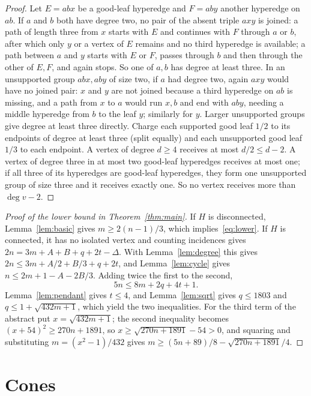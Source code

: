 \documentclass[11pt]{article}
\theoremstyle{remark}
\begin{document}
\begin{proof}
Let $E=abx$ be a good-leaf hyperedge and $F=aby$ another hyperedge on $ab$.
If $a$ and $b$ both have degree two, no pair of the absent triple $axy$ is
joined: a path of length three from $x$ starts with $E$ and continues with
$F$ through $a$ or $b$, after which only $y$ or a vertex of $E$ remains and
no third hyperedge is available; a path between $a$ and $y$ starts with
$E$ or $F$, passes through $b$ and then through the other of $E,F$, and
again stops. So one of $a,b$ has degree at least three. In an unsupported
group $abx,aby$ of size two, if $a$ had degree two, again $axy$ would have
no joined pair: $x$ and $y$ are not joined because a third hyperedge on $ab$
is missing, and a path from $x$ to $a$ would run $x,b$ and end with $aby$,
needing a middle hyperedge from $b$ to the leaf $y$; similarly for $y$.
Larger unsupported groups give degree at least three directly. Charge each supported good leaf $1/2$ to
its endpoints of degree at least three (split equally) and each
unsupported good leaf $1/3$ to each endpoint. A vertex of degree $d\ge4$
receives at most $d/2\le d-2$. A vertex of degree three in at most two
good-leaf hyperedges receives at most one; if all three of its hyperedges
are good-leaf hyperedges, they form one unsupported group of size three
and it receives exactly one. So no vertex receives more than $\deg v-2$.
\end{proof}

\begin{proof}[Proof of the lower bound in Theorem~\ref{thm:main}]
If $H$ is disconnected, Lemma~\ref{lem:basic} gives $m\ge2(n-1)/3$, which
implies~\eqref{eq:lower}. If $H$ is connected, it has no isolated vertex
and counting incidences gives $2n=3m+A+B+q+2t-\Delta$. With
Lemma~\ref{lem:degree} this gives $2n\le3m+A/2+B/3+q+2t$, and
Lemma~\ref{lem:cycle} gives $n\le2m+1-A-2B/3$. Adding twice the first to
the second,
\[
5n\le8m+2q+4t+1 .
\]
Lemma~\ref{lem:pendant} gives $t\le4$, and Lemma~\ref{lem:sqrt} gives
$q\le1803$ and $q\le1+\sqrt{432m+1}$, which yield the two inequalities.
For the third term of the abstract put $x=\sqrt{432m+1}$; the second
inequality becomes $(x+54)^2\ge270n+1891$, so
$x\ge\sqrt{270n+1891}-54>0$, and squaring and substituting
$m=(x^2-1)/432$ gives $m\ge(5n+89)/8-\sqrt{270n+1891}/4$.
\end{proof}

\section{Cones}\label{sec:cones}
\end{document}
